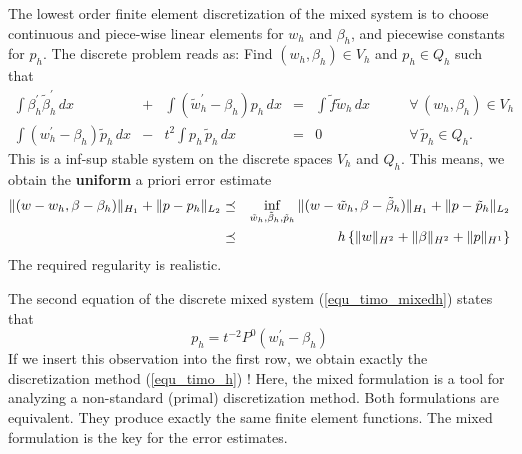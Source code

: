 The lowest order finite element discretization of the mixed system is to choose
continuous and piece-wise linear elements for $w_h$ and $\beta_h$, and piecewise
constants for $p_h$. The discrete problem reads as: Find $(w_h, \beta_h) \in V_h$
and $p_h \in Q_h$ such that
\begin{equation} \label{equ_timo_mixedh}
\begin{array}{ccccll}
\int \beta_h^\prime \tilde \beta_h^\prime \, dx & + & \int (\tilde w_h^\prime - \beta_h) p_h \, dx & = &
\int \tilde f \tilde w_h \, dx \qquad & \forall \, (w_h,\beta_h) \in V_h  \\[0.5em]
\int (w_h^\prime - \beta_h) \tilde p_h \, dx & - & t^2 \int p_h \, \tilde p_h \, dx & = & 0 & 
\forall \, \tilde p_h \in Q_h.
\end{array}
\end{equation}
This is a inf-sup stable system on the discrete spaces $V_h$ and $Q_h$. This means,
we obtain the {\bf uniform} a priori error estimate
\begin{eqnarray*}
\| (w - w_h, \beta - \beta_h) \|_{H_1} + \| p - p_h \|_{L_2} & \preceq & 
\inf_{\tilde w_h, \tilde \beta_h, \tilde p_h}
\| (w - \tilde w_h, \beta - \tilde \beta_h) \|_{H_1} + \| p - \tilde p_h \|_{L_2}  \\
& \preceq & h \left\{ \| w \|_{H^2} + \| \beta \|_{H^2} + \| p \|_{H^1} \right\}
\end{eqnarray*}
The required regularity is realistic.

The second equation of the discrete mixed system (\ref{equ_timo_mixedh}) states that
$$
p_h = t^{-2} P^0 (w_h^\prime - \beta_h)
$$
If we insert this observation into the first row, we obtain exactly the discretization 
method (\ref{equ_timo_h}) ! Here, the mixed formulation is a tool for analyzing a
non-standard (primal) discretization method. Both formulations are equivalent. They produce
exactly the same finite element functions. The mixed formulation is the key for the
error estimates. 



